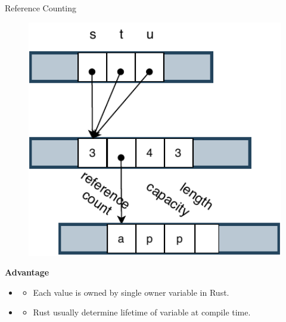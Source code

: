 \documentclass[9pt]{beamer}
\begin{document}
\begin{frame}[t, fragile]{Reference Counting}
\begin{minipage}{0.3\linewidth}
\begin{figure}[hp]
        \end{figure}
    \end{minipage}
    \begin{minipage}{0.3\linewidth}
        \begin{figure}[hp]
            \centering
            \begin{center}
                    \includegraphics[width=1.0\textwidth]{images/rc3.pdf}
                    \captionsetup{labelformat=empty}
            \end{center}
            
        \end{figure}
    \end{minipage}
    \vspace{0.5cm}

    \textbf{Advantage}
    \begin{itemize}
        \item {} 
        \begin{itemize}
            \item Each value is owned by single owner variable in Rust.
        \end{itemize}
        \item {}
        \begin{itemize}
            \item Rust usually determine lifetime of variable at compile time. 
        \end{itemize}
    \end{itemize}
\end{frame}
\end{document}
